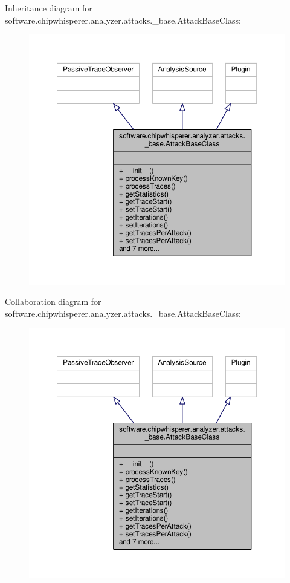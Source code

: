 Inheritance diagram for software.\+chipwhisperer.\+analyzer.\+attacks.\+\_\+base.\+Attack\+Base\+Class\+:\nopagebreak
\begin{figure}[H]
\begin{center}
\leavevmode
\includegraphics[width=350pt]{d8/d10/classsoftware_1_1chipwhisperer_1_1analyzer_1_1attacks_1_1__base_1_1AttackBaseClass__inherit__graph}
\end{center}
\end{figure}


Collaboration diagram for software.\+chipwhisperer.\+analyzer.\+attacks.\+\_\+base.\+Attack\+Base\+Class\+:\nopagebreak
\begin{figure}[H]
\begin{center}
\leavevmode
\includegraphics[width=350pt]{df/db5/classsoftware_1_1chipwhisperer_1_1analyzer_1_1attacks_1_1__base_1_1AttackBaseClass__coll__graph}
\end{center}
\end{figure}


